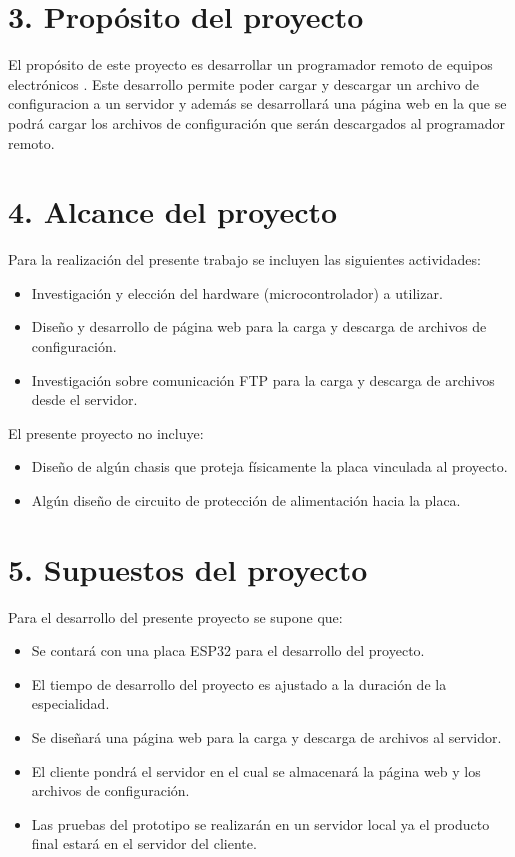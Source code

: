\documentclass[
11pt, %
]{charter}
\begin{document}
\section{3. Propósito del proyecto}
\label{sec:proposito}


El propósito de este proyecto es desarrollar un programador remoto de equipos electrónicos . Este desarrollo permite poder cargar y descargar un archivo de configuracion a un servidor y además se desarrollará una página web en la que se podrá cargar los archivos de configuración que serán descargados al programador remoto.


\newpage
\section{4. Alcance del proyecto}
\label{sec:alcance}

Para la realización del presente trabajo se incluyen las siguientes actividades:

\begin{itemize}
	\item Investigación y elección del hardware (microcontrolador) a utilizar.
	\item Diseño y desarrollo de página web para la carga y descarga de archivos de configuración.
	\item Investigación sobre comunicación FTP para la carga y descarga de archivos desde el servidor.
\end{itemize}

El presente proyecto no incluye:

\begin{itemize}
	\item Diseño de algún chasis que proteja físicamente la placa vinculada al proyecto.
	\item Algún diseño de circuito de protección de alimentación hacia la placa.
\end{itemize}


\section{5. Supuestos del proyecto}
\label{sec:supuestos}


Para el desarrollo del presente proyecto se supone que:

\begin{itemize}
	\item Se contará con una placa ESP32 para el desarrollo del proyecto.
	\item El tiempo de desarrollo del proyecto es ajustado a la duración de la especialidad.
	 \item Se diseñará una página web para la carga y descarga de archivos al servidor.
	 \item El cliente pondrá el servidor en el cual se almacenará la página web y los archivos de configuración.
	 \item Las pruebas del prototipo se realizarán en un servidor local ya el producto final estará en el servidor del cliente.
\end{itemize}
\end{document}
